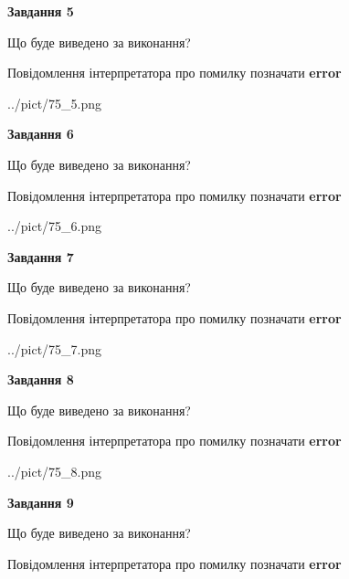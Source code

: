 \documentclass[11pt, ukrainian]{article}
\begin{document}
{\begin {large}
{\begin {center}\textbf{Завдання 5}\end {center}}\par
Що буде виведено за виконання? \par
Повідомлення інтерпретатора про помилку позначати \textbf{error}

\begin{center}
	{../pict/75_5.png}
\end{center}
\newpage

{\begin {center}\textbf{Завдання 6}\end {center}}\par
Що буде виведено за виконання? \par
Повідомлення інтерпретатора про помилку позначати \textbf{error}

\begin{center}
	{../pict/75_6.png}
\end{center}
\newpage

{\begin {center}\textbf{Завдання 7}\end {center}}\par
Що буде виведено за виконання? \par
Повідомлення інтерпретатора про помилку позначати \textbf{error}

\begin{center}
	{../pict/75_7.png}
\end{center}
\newpage

{\begin {center}\textbf{Завдання 8}\end {center}}\par
Що буде виведено за виконання? \par
Повідомлення інтерпретатора про помилку позначати \textbf{error}

\begin{center}
	{../pict/75_8.png}
\end{center}
\newpage

{\begin {center}\textbf{Завдання 9}\end {center}}\par
Що буде виведено за виконання? \par
Повідомлення інтерпретатора про помилку позначати \textbf{error}


\end{large}}
\end{document}
